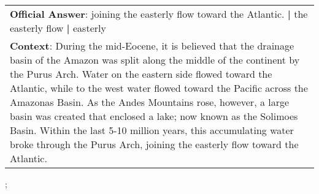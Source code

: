 \begin{figure*}[ht]
{\begin{tabular}{p{}}
            \textbf{Official Answer}: joining the easterly flow toward the Atlantic. \textbf{|} the easterly flow \textbf{|} easterly                                                                                                                                                                                                                                                                                                                                                                                                                                       \\
            \textbf{Context}: During the mid-Eocene, it is believed that the drainage basin of the Amazon was split along the middle of the continent by the Purus Arch. Water on the eastern side flowed toward the Atlantic, while to the west water flowed toward the Pacific across the Amazonas Basin. As the Andes Mountains rose, however, a large basin was created that enclosed a lake; now known as the Solimoes Basin. Within the last 5-10 million years, this accumulating water broke through the Purus Arch, joining the easterly flow toward the Atlantic. \\
        \end{tabular}
    };
    \label{fig:ex-5725c071271a42140099d12b}
\end{figure*}

